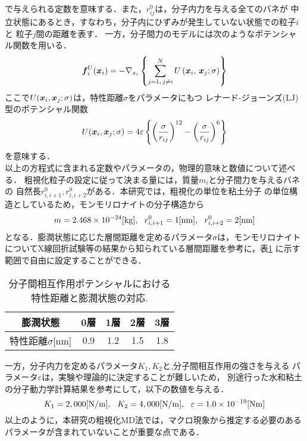 ﻿\documentclass[11pt,a4j]{jarticle}
\begin{document}
で与えられる定数を意味する．また，$r^0_{ij}$は，分子内力を与える全てのバネが
中立状態にあるとき，すなわち，分子内にひずみが発生していない状態での粒子$i$と
粒子$j$間の距離を表す．
一方，分子間力のモデルには次のようなポテンシャル関数を用いる．
\begin{equation}
	\mbox{\boldmath $f$}_i^U(\mbox{\boldmath $x$}_i)
	=
	-\nabla_{x_i} 
	\left\{ 
		\sum_{j=1, \, j \neq i}^N U\left(\mbox{\boldmath $x$}_i,\,\mbox{\boldmath $x$}_j; \sigma \right)
	\right\}
	\label{eqn:}
\end{equation}
ここで$U(\mbox{\boldmath $x$}_i,\mbox{\boldmath $x$}_j;\sigma)$は，特性距離$\sigma$をパラメータにもつ
レナード-ジョーンズ(LJ)型のポテンシャル関数
\begin{equation}
	U(\mbox{\boldmath $x$}_i,\mbox{\boldmath $x$}_j; \sigma) 
	= 4 \varepsilon 
	\left\{ 
	\left(\frac{\sigma}{r_{ij}}\right)^{12}
	-
	\left(\frac{\sigma}{r_{ij}}\right)^6
	\right\}
	\label{eqn:}
\end{equation}
を意味する．\\

以上の方程式に含まれる定数やパラメータの，物理的意味と数値について述べる．
粗視化粒子の設定に従って決まる量には，質量$m_i$と分子間力を与えるバネの
自然長$r^0_{i,i+1}, r^0_{i,i+2}$がある．本研究では，粗視化の単位を粘土分子
の単位構造としているため，モンモリロナイトの分子構造から
\begin{equation}
	m=2.468\times 10 ^{-24}[{\rm kg}]
	, \ \ 
	r^0_{i,i+1}=1[{\rm nm}], \ \ 
	r^0_{i,i+2}=2[{\rm nm}]
	\label{eqn:}
\end{equation}
となる．膨潤状態に応じた層間距離を定めるパラメータ$\sigma$は，モンモリロナイト
についてX線回折試験等の結果から知られている層間距離を参考に，表\ref{tbl:tbl_sig}
に示す範囲で自由に設定することができる．
\begin{table}[h]
	\begin{center}
	\caption{分子間相互作用ポテンシャルにおける特性距離と膨潤状態の対応.}
	\vspace{3mm}
	\begin{tabular}{c||c|c|c|c}
		膨潤状態 & 0層 & 1層 & 2層 & 3層 \\
		\hline
		特性距離$\sigma$[{\rm nm}]& 0.9 & 1.2 & 1.5 & 1.8 \\
	\end{tabular}
	\label{tbl:tbl_sig}
	\end{center}
\end{table}
一方，分子内力を定めるパラメータ$K_1, K_2$と,分子間相互作用の強さを与える
パラメータ$\varepsilon$は，実験や理論的に決定することが難しいため，
別途行った水和粘土の分子動力学計算結果を参考にして，以下の数値を与える．
\begin{equation}
	K_1=2,000[{\rm N/m}], \ \ 
	K_2=4,000[{\rm N/m}], \ \ 
	\varepsilon=1.0\times 10^{-19}[{\rm Nm}]
	\label{eqn:}
\end{equation}
以上のように，本研究の粗視化MD法では，マクロ現象から推定する必要のある
パラメータが含まれていないことが重要な点である．
%
\end{document}

